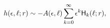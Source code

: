 \[\mathop{h\/}\nolimits\!\left(\epsilon,\ell;r\right)\sim-A(\epsilon,\ell)\sum_{%
k=0}^{\infty}\epsilon^{k}{\sf H}_{k}(\ell;r),\]